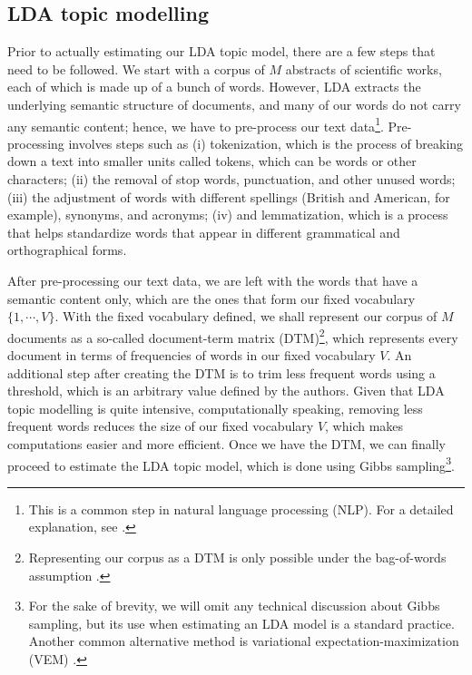 \subsection{LDA topic modelling} \label{topic_modelling}

Prior to actually estimating our LDA topic model, there are a few steps that need to be followed. We start with a corpus of $M$ abstracts of scientific works, each of which is made up of a bunch of words. However, LDA extracts the underlying semantic structure of documents, and many of our words do not carry any semantic content; hence, we have to pre-process our text data\footnote{This is a common step in natural language processing (NLP). For a detailed explanation, see \cite[p. 9-12]{ponweiser_latent_2012}.}. Pre-processing involves steps such as (i) tokenization, which is the process of breaking down a text into smaller units called tokens, which can be words or other characters; (ii) the removal of stop words, punctuation, and other unused words; (iii) the adjustment of words with different spellings (British and American, for example), synonyms, and acronyms; (iv) and lemmatization, which is a process that helps standardize words that appear in different grammatical and orthographical forms. 

After pre-processing our text data, we are left with the words that have a semantic content only, which are the ones that form our fixed vocabulary $\{1, \cdots, V \}$. With the fixed vocabulary defined, we shall represent our corpus of $M$ documents as a so-called document-term matrix (DTM)\footnote{Representing our corpus as a DTM is only possible under the bag-of-words assumption \citep{ponweiser_latent_2012}.}, which represents every document in terms of frequencies of words in our fixed vocabulary $V$. An additional step after creating the DTM is to trim less frequent words using a threshold, which is an arbitrary value defined by the authors. Given that LDA topic modelling is quite intensive, computationally speaking, removing less frequent words reduces the size of our fixed vocabulary $V$, which makes computations easier and more efficient. Once we have the DTM, we can finally proceed to estimate the LDA topic model, which is done using Gibbs sampling\footnote{For the sake of brevity, we will omit any technical discussion about Gibbs sampling, but its use when estimating an LDA model is a standard practice. Another common alternative method is variational expectation-maximization (VEM) \citep{grun_topicmodels_2011}.}.

